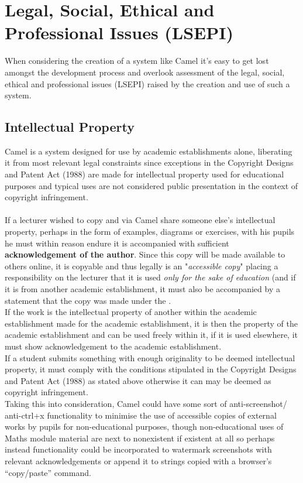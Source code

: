 \newpage
\section{Legal, Social, Ethical and Professional Issues (LSEPI)}
    When considering the creation of a system like Camel it’s easy to get lost amongst the development process and overlook assessment of the legal, social, ethical and professional issues (LSEPI) raised by the creation and use of such a system.
\subsection*{Intellectual Property}
Camel is a system designed for use by academic establishments alone, liberating it from most relevant legal constraints since exceptions in the Copyright Designs and Patent Act (1988) are made for intellectual property used for educational purposes and typical uses are not considered public presentation in the context of copyright infringement.
\\\\If a lecturer wished to copy and via Camel share someone else's intellectual property, perhaps in the form of examples, diagrams or exercises, with his pupils he must within reason endure it is accompanied with sufficient \textbf{acknowledgement of the author}. Since this copy will be made available to others online, it is copyable and thus legally is an "\textit{accessible copy}" placing a responsibility on the lecturer that it is used \emph{only for the sake of education} (and if it is from another academic establishment, it must also be accompanied by a statement that the copy was made under the \cite[(Pt 1, Ch 3, §31B)]{CDaPA}.
\\If the work is the intellectual property of another within the academic establishment made for the academic establishment, it is then the property of the academic establishment and can be used freely within it, if it is used elsewhere, it must show acknowledgement to the academic establishment.
\\If a student submits something with enough originality to be deemed intellectual property, it must comply with the conditions stipulated in the Copyright Designs and Patent Act (1988) as stated above otherwise it can may be deemed as copyright infringement.
\\Taking this into consideration, Camel could have some sort of anti-screenshot/ anti-ctrl+x functionality to minimise the use of accessible copies of external works by pupils for non-educational purposes, though non-educational uses of Maths module material are next to nonexistent if existent at all so perhaps instead functionality could be incorporated to watermark screenshots with relevant acknowledgements or append it to strings copied with a browser’s “copy/paste” command.
